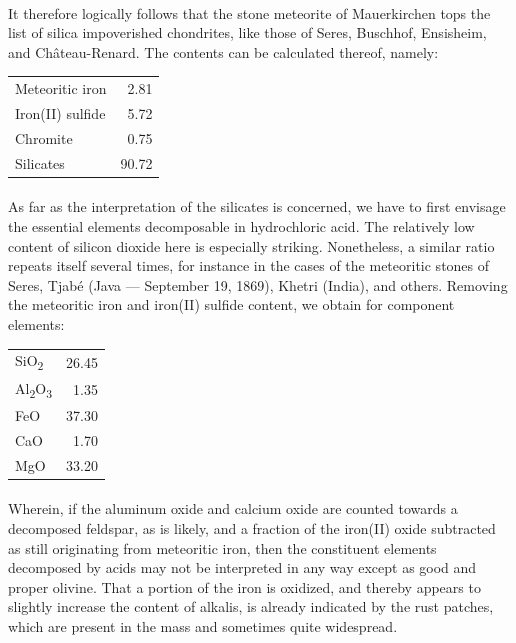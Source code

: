\documentclass[a4paper, 12pt, oneside]{article}
\begin{document}
\paragraph*{}
It therefore logically follows that the stone meteorite of Mauerkirchen tops the list of silica impoverished chondrites, like those of Seres, Buschhof, Ensisheim, and Château-Renard. The contents can be calculated thereof, namely:
\begin{center}
    \begin{tabular}{l r}
        Meteoritic iron & 2.81\\
        Iron(II) sulfide & 5.72\\
        Chromite & 0.75\\
        Silicates & 90.72\\
    \end{tabular}
\end{center}
\paragraph*{}
As far as the interpretation of the silicates is concerned, we have to first envisage the essential elements decomposable in hydrochloric acid. The relatively low content of silicon dioxide here is especially striking. Nonetheless, a similar ratio repeats itself several times, for instance in the cases of the meteoritic stones of Seres, Tjabé (Java --- September 19, 1869), Khetri (India), and others. Removing the meteoritic iron and iron(II) sulfide content, we obtain for component elements:
\begin{center}
    \begin{tabular}{l r}
        SiO\textsubscript{2} & 26.45\\
        Al\textsubscript{2}O\textsubscript{3} & 1.35\\
        FeO & 37.30\\
        CaO & 1.70\\
        MgO & 33.20\\
    \end{tabular}
\end{center}
\paragraph*{}
Wherein, if the aluminum oxide and calcium oxide are counted towards a decomposed feldspar, as is likely, and a fraction of the iron(II) oxide subtracted as still originating from meteoritic iron, then the constituent elements decomposed by acids may not be interpreted in any way except as good and proper olivine. That a portion of the iron is oxidized, and thereby appears to slightly increase the content of alkalis, is already indicated by the rust patches, which are present in the mass and sometimes quite widespread.
\end{document}
